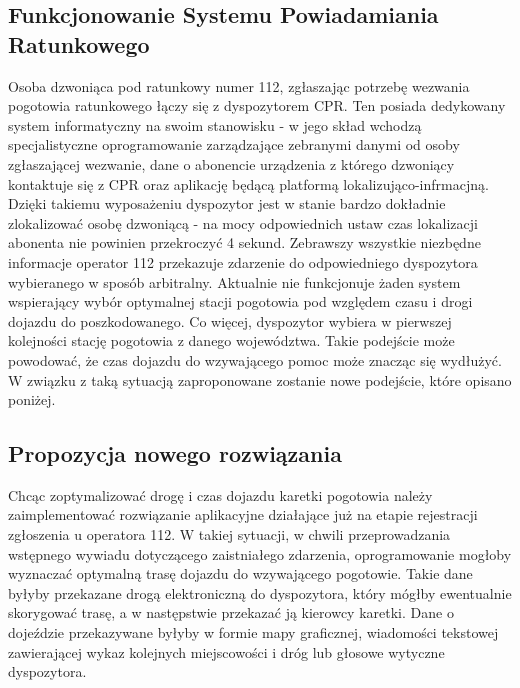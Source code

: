 \documentclass[12pt]{article} %
\begin{document}
\subsection{Funkcjonowanie Systemu Powiadamiania Ratunkowego}

Osoba dzwoniąca pod ratunkowy numer 112, zgłaszając potrzebę wezwania pogotowia ratunkowego łączy się z dyspozytorem CPR. Ten posiada dedykowany system informatyczny na swoim stanowisku - w jego skład wchodzą specjalistyczne oprogramowanie zarządzające zebranymi danymi od osoby zgłaszającej wezwanie, dane o abonencie urządzenia z którego dzwoniący kontaktuje się z CPR oraz aplikację będącą platformą lokalizująco-infrmacjną. Dzięki takiemu wyposażeniu dyspozytor jest w stanie bardzo dokładnie zlokalizować osobę dzwoniącą - na mocy odpowiednich ustaw czas lokalizacji abonenta nie powinien przekroczyć 4 sekund. 
Zebrawszy wszystkie niezbędne informacje operator 112 przekazuje zdarzenie do odpowiedniego dyspozytora wybieranego w sposób arbitralny. Aktualnie nie funkcjonuje żaden system wspierający wybór optymalnej stacji pogotowia pod względem czasu i drogi dojazdu do poszkodowanego. Co więcej, dyspozytor wybiera w pierwszej kolejności stację pogotowia z danego województwa. Takie podejście może powodować, że czas dojazdu do wzywającego pomoc może znacząc się wydłużyć. W związku z taką sytuacją zaproponowane zostanie nowe podejście, które opisano poniżej.

\subsection{Propozycja nowego rozwiązania}
Chcąc zoptymalizować drogę i czas dojazdu karetki pogotowia należy zaimplementować rozwiązanie aplikacyjne działające już na etapie rejestracji zgłoszenia u operatora 112. W takiej sytuacji, w chwili przeprowadzania wstępnego wywiadu dotyczącego zaistniałego zdarzenia, oprogramowanie mogłoby wyznaczać optymalną trasę dojazdu do wzywającego pogotowie. Takie dane byłyby przekazane drogą elektroniczną do dyspozytora, który mógłby ewentualnie skorygować trasę, a w następstwie przekazać ją kierowcy karetki. Dane o dojeździe przekazywane byłyby w formie mapy graficznej, wiadomości tekstowej zawierającej wykaz kolejnych miejscowości i dróg lub głosowe wytyczne dyspozytora. 
\end{document}
